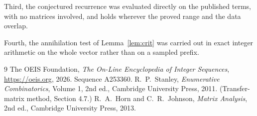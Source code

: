 \documentclass[11pt,a4paper]{article}
\theoremstyle{plain}
\theoremstyle{definition}
\begin{document}
Third, the conjectured recurrence was evaluated directly on the published terms, with no
matrices involved, and holds wherever the proved range and the data overlap.

Fourth, the annihilation test of Lemma~\ref{lem:crit} was carried out in exact integer
arithmetic on the whole vector rather than on a sampled prefix.

\begin{thebibliography}{9}
 The OEIS Foundation, \emph{The On-Line Encyclopedia of Integer
Sequences}, \url{https://oeis.org}, 2026. Sequence A253360.
 R.~P.~Stanley, \emph{Enumerative Combinatorics}, Volume 1, 2nd ed.,
Cambridge University Press, 2011. (Transfer-matrix method, Section 4.7.)
 R.~A.~Horn and C.~R.~Johnson, \emph{Matrix Analysis}, 2nd ed., Cambridge
University Press, 2013.
\end{thebibliography}
\end{document}
